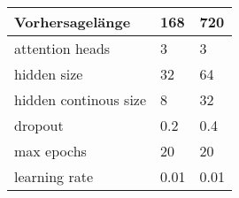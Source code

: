 \begin{tabular}{
    l
    l
    l
}
    \toprule
    Vorhersagelänge & {168} & {720} \\
    \midrule
    attention heads & 3 & 3 \\
    hidden size & 32 & 64 \\
    hidden continous size & 8 & 32 \\
    dropout & 0.2 & 0.4 \\
    max epochs & 20 & 20 \\
    learning rate & 0.01 & 0.01 \\
\end{tabular}

